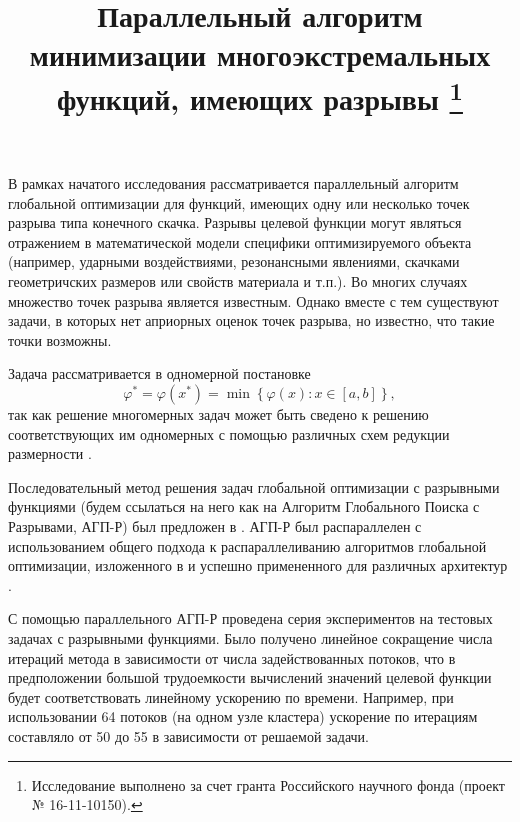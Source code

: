 \documentclass[11pt, oneside, a4paper]{article}
\begin{document}

\title{Параллельный алгоритм минимизации многоэкстремальных функций, имеющих разрывы \footnote{Исследование выполнено за счет гранта Российского научного фонда (проект № 16-11-10150).}}


В рамках начатого исследования рассматривается параллельный алгоритм глобальной оптимизации для функций, имеющих одну или несколько точек разрыва типа конечного скачка. Разрывы целевой функции могут являться отражением в математической модели специфики оптимизируемого объекта (например, ударными воздействиями, резонансными явлениями, скачками геометричских размеров или свойств материала и т.п.). Во многих случаях множество точек разрыва является известным. Однако вместе с тем существуют задачи, в которых нет априорных оценок точек разрыва, но известно, что такие точки возможны. 

Задача рассматривается в одномерной постановке
\[
\varphi^* = \varphi(x^*)=\min\left\{\varphi(x):x\in[a,b]\right\},
\] 
так как решение многомерных задач может быть сведено к решению соответствующих им одномерных с помощью различных схем редукции размерности \cite{Strongin91}.

Последовательный метод решения задач глобальной оптимизации с разрывными функциями (будем ссылаться на него как на Алгоритм Глобального Поиска с Разрывами, АГП-Р) был предложен в \cite{Strongin91}.
АГП-Р был распараллелен с использованием общего подхода к распараллеливанию алгоритмов глобальной оптимизации, изложенного в \cite{Strongin13} и успешно примененного для различных архитектур \cite{Barkalov14,Barkalov16}.

С помощью параллельного АГП-Р проведена серия экспериментов на тестовых задачах с разрывными функциями.
Было получено линейное сокращение числа итераций метода в зависимости от числа задействованных потоков, что в предположении большой трудоемкости вычислений значений целевой функции будет соответствовать линейному ускорению по времени. Например, при использовании 64 потоков (на одном узле кластера) ускорение по итерациям составляло от 50 до 55 в зависимости от решаемой задачи.

\end{document}
